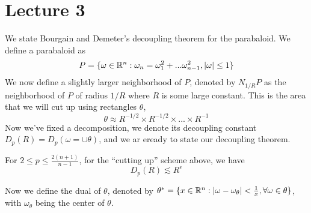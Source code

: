 \section*{Lecture 3}
We state Bourgain and Demeter's decoupling theorem for the parabaloid. We define a parabaloid as
\begin{equation*}
    P=\{\omega\in\mathbb{R}^n: \omega_n=\omega_1^2+...\omega_{n-1}^2, |\omega|\leq 1\}
\end{equation*}
We now define a slightly larger neighborhood of $P$, denoted by $N_{1/R}P$ as the neighborhood of $P$ of radius $1/R$ where $R$ is some large constant. This is the area that we will cut up using rectangles $\theta$,
\begin{equation*}
    \theta\approx R^{-1/2}\times R^{-1/2}\times...\times R^{-1}
\end{equation*}
Now we've fixed a decomposition, we denote its decoupling constant $D_p(R)=D_p(\omega=\cup\theta)$, and we ar eready to state our decoupling theorem.

\begin{theorem}
    For $2\leq p\leq\frac{2(n+1)}{n-1}$, for the ``cutting up'' scheme above, we have
    \begin{equation*}
        D_p(R)\lesssim R^{\epsilon}
    \end{equation*}
\end{theorem}

Now we define the dual of $\theta$, denoted by $\theta^*=\{x\in\mathbb{R}^n: |\omega-\omega_\theta|<\frac{1}{x}, \forall\omega\in\theta\}$, with $\omega_\theta$ being the center of $\theta$.


